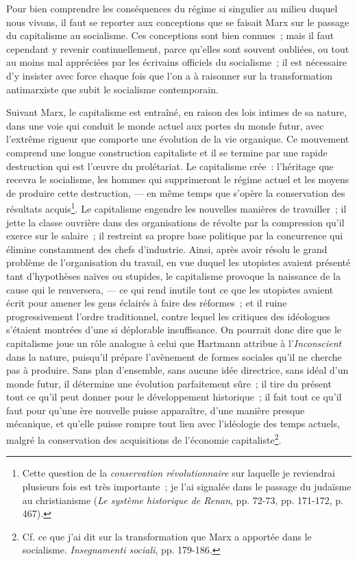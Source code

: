 \documentclass[french,twoside]{book} %
\begin{document}
\noindent Pour bien comprendre les conséquences du régime si singulier au milieu duquel nous vivons, il faut se reporter aux conceptions que se faisait Marx sur le passage du capitalisme au socialisme. Ces conceptions sont bien connues ; mais il faut cependant y revenir continuellement, parce qu’elles sont souvent oubliées, ou tout au moins  mal appréciées par les écrivains officiels du socialisme ; il est nécessaire d’y insister avec force chaque fois que l’on a à raisonner sur la transformation antimarxiste que subit le socialisme contemporain.\par
Suivant Marx, le capitalisme est entraîné, en raison des lois intimes de sa nature, dans une voie qui conduit le monde actuel aux portes du monde futur, avec l’extrême rigueur que comporte une évolution de la vie organique. Ce mouvement comprend une longue construction capitaliste et il se termine par une rapide destruction qui est l’œuvre du prolétariat. Le capitalisme crée : l’héritage que recevra le socialisme, les hommes qui supprimeront le régime actuel et les moyens de produire cette destruction, — en même temps que s’opère la conservation des résultats acquis\footnote{ \noindent Cette question de la \emph{conservation révolutionnaire} sur laquelle je reviendrai plusieurs fois est très importante ; je l’ai signalée dans le passage du judaïsme au christianisme (\emph{Le système historique de Renan}, pp. 72-73, pp. 171-172, p. 467).
 }. Le capitalisme engendre les nouvelles manières de travailler ; il jette la classe ouvrière dans des organisations de révolte par la compression qu’il exerce sur le salaire ; il restreint sa propre base politique par la concurrence qui élimine constamment des chefs d’industrie. Ainsi, après avoir résolu le grand problème de l’organisation du travail, en vue duquel les utopistes avaient présenté tant d’hypothèses naïves ou stupides, le capitalisme provoque la naissance de la cause qui le renversera, — ce qui rend inutile tout ce que les utopistes avaient écrit pour amener  les gens éclairés à faire des réformes ; et il ruine progressivement l’ordre traditionnel, contre lequel les critiques des idéologues s’étaient montrées d’une si déplorable insuffisance. On pourrait donc dire que le capitalisme joue un rôle analogue à celui que Hartmann attribue à l’\emph{Inconscient} dans la nature, puisqu’il prépare l’avènement de formes sociales qu’il ne cherche pas à produire. Sans plan d’ensemble, sans aucune idée directrice, sans idéal d’un monde futur, il détermine une évolution parfaitement sûre ; il tire du présent tout ce qu’il peut donner pour le développement historique ; il fait tout ce qu’il faut pour qu’une ère nouvelle puisse apparaître, d’une manière presque mécanique, et qu’elle puisse rompre tout lien avec l’idéologie des temps actuels, malgré la conservation des acquisitions de l’économie capitaliste\footnote{ \noindent Cf. ce que j’ai dit sur la transformation que Marx a apportée dans le socialisme. \emph{Insegnamenti sociali}, pp. 179-186.
 }.\par
\end{document}
